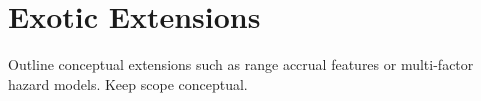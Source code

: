 \section{Exotic Extensions}

Outline conceptual extensions such as range accrual features or multi-factor hazard models. Keep scope conceptual.
